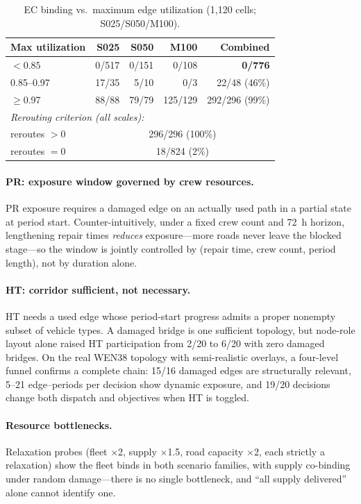 \documentclass[10pt,conference,letterpaper]{IEEEtran}
\begin{document}
\begin{table}[t]
\centering
\caption{EC binding vs.\ maximum edge utilization (1{,}120 cells;
S025/S050/M100).}
\label{tab:ecbands}
\begin{tabular}{lrrrr}
\toprule
Max utilization & S025 & S050 & M100 & Combined \\
\midrule
$<0.85$ & 0/517 & 0/151 & 0/108 & \textbf{0/776} \\
0.85--0.97 & 17/35 & 5/10 & 0/3 & 22/48 (46\%) \\
$\ge$0.97 & 88/88 & 79/79 & 125/129 & 292/296 (99\%) \\
\midrule
\multicolumn{5}{l}{\emph{Rerouting criterion (all scales):}} \\
reroutes $>0$ & \multicolumn{4}{c}{296/296 (100\%)} \\
reroutes $=0$ & \multicolumn{4}{c}{18/824 (2\%)} \\
\bottomrule
\end{tabular}
\end{table}

\paragraph{PR: exposure window governed by crew resources.}
PR exposure requires a damaged edge on an actually used path in a partial
state at period start. Counter-intuitively, under a fixed crew count and
72~h horizon, lengthening repair times \emph{reduces} exposure---more
roads never leave the blocked stage---so the window is jointly controlled
by (repair time, crew count, period length), not by duration alone.

\paragraph{HT: corridor sufficient, not necessary.}
HT needs a used edge whose period-start progress admits a proper nonempty
subset of vehicle types. A damaged bridge is one sufficient topology, but
node-role layout alone raised HT participation from 2/20 to 6/20 with zero
damaged bridges. On the real WEN38 topology with semi-realistic overlays,
a four-level funnel confirms a complete chain: 15/16 damaged edges are
structurally relevant, 5--21 edge--periods per decision show dynamic
exposure, and 19/20 decisions change both dispatch and objectives when HT
is toggled.

\paragraph{Resource bottlenecks.}
Relaxation probes (fleet $\times$2, supply $\times$1.5, road capacity
$\times$2, each strictly a relaxation) show the fleet binds in both
scenario families, with supply co-binding under random damage---there is
no single bottleneck, and ``all supply delivered'' alone cannot identify
one.
\end{document}
